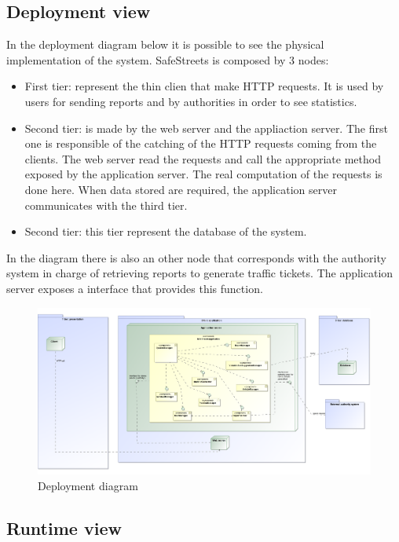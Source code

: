 \subsection{Deployment view}
In the deployment diagram below it is possible to see the physical implementation of the system.
SafeStreets is composed by 3 nodes:
\begin{itemize}
	\item 
	First tier: represent the thin clien that make HTTP requests. It is used by users for sending reports and by authorities in order to see statistics.
	\item 
	Second tier: is made by the web server and the appliaction server. The first one is responsible of the catching of the HTTP requests coming from the clients. The web server read the requests and call the appropriate method exposed by the application server. The real computation of the requests is done here.
	When data stored are required, the application server communicates with the third tier.
	\item 
	Second tier: this tier represent the database of the system. 
\end{itemize} 

In the diagram there is also an other node that corresponds with the authority system in charge of retrieving reports to generate traffic tickets. The application server exposes a interface that provides this function. 

\begin{figure}[H]
	\centering
	\includegraphics[width=1.12\linewidth]{Images/Deployment.png}
	\caption{Deployment diagram}
\end{figure}

\subsection{Runtime view}
\newpage

